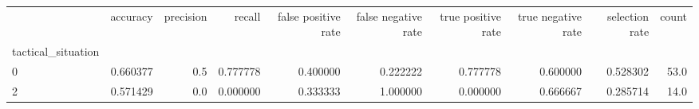 \begin{tabular}{lrrrrrrrrr}
\toprule
{} &  accuracy &  precision &    recall &  false positive rate &  false negative rate &  true positive rate &  true negative rate &  selection rate &  count \\
tactical\_situation &           &            &           &                      &                      &                     &                     &                 &        \\
\midrule
0                  &  0.660377 &        0.5 &  0.777778 &             0.400000 &             0.222222 &            0.777778 &            0.600000 &        0.528302 &   53.0 \\
2                  &  0.571429 &        0.0 &  0.000000 &             0.333333 &             1.000000 &            0.000000 &            0.666667 &        0.285714 &   14.0 \\
\bottomrule
\end{tabular}
